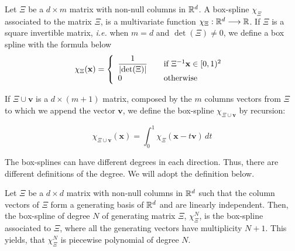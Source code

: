 \documentclass[proc]{edpsmath}
\begin{document}
\begin{dfntn}

	Let $\Xi$ be a $d \times m$ matrix with non-null columns in  $\mathbb{R}^d$. A box-spline $\chi_\Xi$ associated to the matrix $\Xi$, is a multivariate function $\chi_\Xi : \mathbb{R}^d \longrightarrow \mathbb{R}$. If $\Xi$ is a square invertible matrix, \emph{i.e.} when $m = d$ and $\det(\Xi) \neq 0$, we define a box spline with the formula below
	\begin{equation}
		\chi_{\Xi} (\mathbf{x}) = \left\{
  		\begin{array}{l l}
    		\dfrac{1}{\lvert \det(\Xi)\rvert} & \quad \text{if $\Xi^{-1}\mathbf{x} \in [0,1)^2$ }\\
    		0 & \quad \text{otherwise}
  		\end{array} \right.
	\end{equation}

	If $\Xi \cup \mathbf{v}$ is a $d \times (m + 1)$ matrix, composed by the $m$ columns vectors from $\Xi$ to which we append the vector $\mathbf{v}$, we define the box-spline $\chi_{\Xi \cup \mathbf{v}}$ by recursion:

	\begin{equation} 
	\label{eqn:boxsplines_basis}
		\chi_{\Xi \cup \mathbf{v}}(\mathbf{x}) = \int_0^ 1 \chi_\Xi(\mathbf{x}-t\mathbf{v}) \, dt
	\end{equation}

\end{dfntn}

\rmrk The box-splines can have different degrees in each direction. Thus, there are different definitions of the degree. We will adopt the definition below.

\begin{dfntn}
Let $\Xi$ be a $d \times d$ matrix with non-null columns in $\mathbb{R}^d$ such that the column vectors of $\Xi$ form a generating basis of $\mathbb{R}^d$ and are linearly independent. Then, the box-spline of degree $N$ of generating matrix $\Xi$, $\chi^N_\Xi$, is the box-spline associated to $\Xi$, where all the generating vectors have multiplicity $N+1$. This yields, that $\chi^N_\Xi$ is piecewise polynomial of degree $N$.


\end{dfntn}
\end{document}
